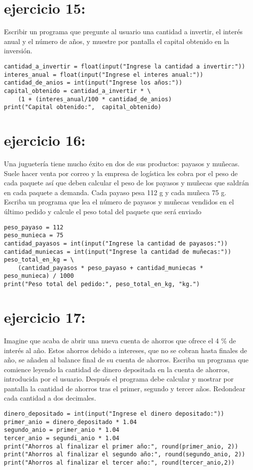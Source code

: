 \documentclass[11pt]{article}
\begin{document}
\section{ejercicio 15:}
\label{sec:org15654aa}
Escribir un programa que pregunte al usuario una cantidad a
invertir, el interés anual y el número de años, y muestre por pantalla el
capital obtenido en la inversión.
\begin{verbatim}
cantidad_a_invertir = float(input("Ingrese la cantidad a invertir:"))
interes_anual = float(input("Ingrese el interes anual:"))
cantidad_de_anios = int(input("Ingrese los años:"))
capital_obtenido = cantidad_a_invertir * \
    (1 + (interes_anual/100 * cantidad_de_anios)
print("Capital obtenido:",  capital_obtenido)
\end{verbatim}
\section{ejercicio 16:}
\label{sec:orgc2d6c15}
Una juguetería tiene mucho éxito en dos de sus productos:
payasos y muñecas. Suele hacer venta por correo y la empresa de logística
les cobra por el peso de cada paquete así que deben calcular el
peso de los payasos y muñecas que saldrán en cada paquete a demanda.
Cada payaso pesa 112 g y cada muñeca 75 g. Escriba un programa que
lea el número de payasos y muñecas vendidos en el último pedido y
calcule el peso total del paquete que será enviado
\begin{verbatim}
peso_payaso = 112
peso_munieca = 75
cantidad_payasos = int(input("Ingrese la cantidad de payasos:"))
cantidad_muniecas = int(input("Ingrese la cantidad de muñecas:"))
peso_total_en_kg = \
    (cantidad_payasos * peso_payaso + cantidad_muniecas * peso_munieca) / 1000
print("Peso total del pedido:", peso_total_en_kg, "kg.")
\end{verbatim}
\section{ejercicio 17:}
\label{sec:org7b024c9}
Imagine que acaba de abrir una nueva cuenta de ahorros que
ofrece el 4 \% de interés al año. Estos ahorros debido a intereses, que no
se cobran hasta finales de año, se añaden al balance final de su cuenta
de ahorros. Escriba un programa que comience leyendo la cantidad de
dinero depositada en la cuenta de ahorros, introducida por el usuario.
Después el programa debe calcular y mostrar por pantalla la cantidad
de ahorros tras el primer, segundo y tercer años. Redondear cada
cantidad a dos decimales.
\begin{verbatim}
dinero_depositado = int(input("Ingrese el dinero depositado:"))
primer_anio = dinero_depositado * 1.04
segundo_anio = primer_anio * 1.04
tercer_anio = segundi_anio * 1.04
print("Ahorros al finalizar el primer año:", round(primer_anio, 2))
print("Ahorros al finalizar el segundo año:", round(segundo_anio, 2))
print("Ahorros al finalizar el tercer año:", round(tercer_anio,2))
\end{verbatim}
\end{document}
